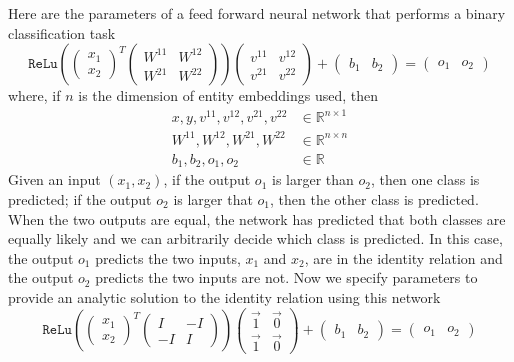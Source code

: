 \documentclass{article}
\begin{document}
Here are the parameters of a feed forward neural network that performs a binary classification task
%
\[ \texttt{ReLu}(\begin{pmatrix} x_1 \\ x_2  \end{pmatrix}^T \begin{pmatrix} W^{11} & W^{12}\\ W^{21}& W^{22} \end{pmatrix}) \begin{pmatrix} v^{11} & v^{12} \\ v^{21} & v^{22} \end{pmatrix} + \begin{pmatrix}b_1 &b_2 \end{pmatrix}= \begin{pmatrix} o_1 & o_2\end{pmatrix}\]
%
where, if $n$ is the dimension of entity embeddings used, then
%
\begin{align*}
  x, y,v^{11}, v^{12}, v^{21}, v^{22} &\in \mathbb{R}^{n \times 1} \\
  W^{11}, W^{12},W^{21}, W^{22} &\in \mathbb{R}^{n \times n} \\
  b_1, b_2, o_1, o_2 &\in \mathbb{R}
\end{align*}
%
Given an input $(x_1,x_2)$, if the output $o_1$ is larger than $o_2$, then one class is predicted; if the output $o_2$ is larger that $o_1$, then the other class is predicted. When the two outputs are equal, the network has predicted that both classes are equally likely and we can arbitrarily decide which class is predicted. In this case, the output $o_1$ predicts the two inputs, $x_1$ and $x_2$, are in the identity relation and the output $o_2$ predicts the two inputs are not. Now we specify parameters to provide an analytic solution to the identity relation using this network
%
\[ \texttt{ReLu}(\begin{pmatrix} x_1 \\ x_2 \end{pmatrix}^T \begin{pmatrix} I & -I\\ -I& I \end{pmatrix}) \begin{pmatrix} \vec{1} & \vec{0} \\ \vec{1} & \vec{0} \end{pmatrix} + \begin{pmatrix}b_1 &b_2 \end{pmatrix}= \begin{pmatrix} o_1 & o_2\end{pmatrix}\]
\end{document}
